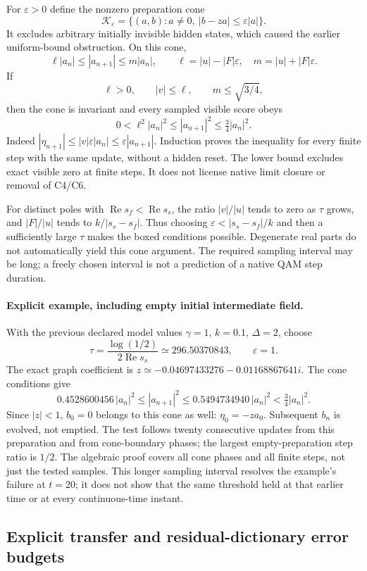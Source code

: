 \documentclass[11pt,a4paper]{article}
\begin{document}
For $\varepsilon>0$ define the nonzero preparation cone
\[
 \mathcal K_\varepsilon=
 \{(a,b):a\ne0,\ |b-za|\leq\varepsilon|a|\}.
\]
It excludes arbitrary initially invisible hidden states, which
caused the earlier uniform-bound obstruction. On this cone,
\[
 \ell |a_n|\leq|a_{n+1}|\leq m|a_n|,
 \qquad
 \ell=|u|-|F|\varepsilon,\quad
 m=|u|+|F|\varepsilon.
\]
If
\[
 \boxed{\quad \ell>0,\qquad |v|\leq\ell,
              \qquad m\leq\sqrt{3/4},\quad}
\]
then the cone is invariant and every sampled visible score obeys
\[
 0<\ell^2|a_n|^2\leq|a_{n+1}|^2
       \leq\tfrac34|a_n|^2.
\]
Indeed $|\eta_{n+1}|\leq|v|\varepsilon|a_n|
\leq\varepsilon|a_{n+1}|$. Induction proves the inequality for
every finite step with the same update, without a hidden reset.
The lower bound excludes exact visible zero at finite steps.
It does not license native limit closure or removal of C4/C6.

For distinct poles with
$\operatorname{Re}s_f<\operatorname{Re}s_s$, the ratio
$|v|/|u|$ tends to zero as $\tau$ grows, and
$|F|/|u|$ tends to $k/|s_s-s_f|$.
Thus choosing $\varepsilon<|s_s-s_f|/k$ and then a sufficiently
large $\tau$ makes the boxed conditions possible. Degenerate
real parts do not automatically yield this cone argument.
The required sampling interval may be long; a freely chosen
interval is not a prediction of a native QAM step duration.

\paragraph{Explicit example, including empty initial intermediate field.}
With the previous declared model values
$\gamma=1$, $k=0.1$, $\Delta=2$, choose
\[
 \tau=\frac{\log(1/2)}{2\operatorname{Re}s_s}
        \simeq296.50370843,\qquad \varepsilon=1.
\]
The exact graph coefficient is
$z\simeq-0.04697433276-0.01168867641i$. The cone conditions give
\[
 0.4528600456\,|a_n|^2
 \leq |a_{n+1}|^2
 \leq0.5494734940\,|a_n|^2 <\tfrac34|a_n|^2.
\]
Since $|z|<1$, $b_0=0$ belongs to this cone as well:
$\eta_0=-za_0$. Subsequent $b_n$ is evolved, not emptied. The
test follows twenty consecutive updates from this preparation
and from cone-boundary phases; the largest empty-preparation
step ratio is $1/2$. The algebraic proof covers all cone phases
and all finite steps, not just the tested samples. This longer
sampling interval resolves the example's failure at $t=20$;
it does not show that the same threshold held at that earlier
time or at every continuous-time instant.

\subsection{Explicit transfer and residual-dictionary error budgets}
\end{document}
